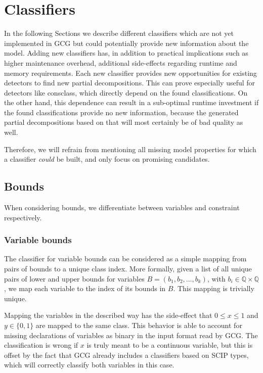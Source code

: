 	\section{Classifiers}
	
		In the following Sections we describe different classifiers which are not yet implemented in \ac{GCG} but could potentially provide new information about the model.
		Adding new classifiers has, in addition to practical implications such as higher maintenance overhead, additional side-effects regarding runtime and memory requirements.
		Each new classifier provides new opportunities for existing detectors to find new partial decompositions.
		This can prove especially useful for detectors like consclass, which directly depend on the found classifications.
		On the other hand, this dependence can result in a sub-optimal runtime investment if the found classifications provide no new information, because the generated partial decompositions based on that will most certainly be of bad quality as well. 
		
		Therefore, we will refrain from mentioning all missing model properties for which a classifier \textit{could} be built, and only focus on promising candidates.
		
		\clearpage
		
		\subsection{Bounds}
			
			When considering bounds, we differentiate between variables and constraint respectively.
			
			\subsubsection{Variable bounds}
			
				The classifier for variable bounds can be considered as a simple mapping from pairs of bounds to a unique class index.
				More formally, given a list of all unique pairs of lower and upper bounds for variables $B = (b_1, b_2, \ldots, b_k)$, with $b_i \in \mathbb{Q} \times \mathbb{Q}$, we map each variable to the index of its bounds in $B$.
				This mapping is trivially unique.
				
				Mapping the variables in the described way has the side-effect that $0 \leq x \leq 1$ and $y \in \{ 0, 1 \} $ are mapped to the same class.
				This behavior is able to account for missing declarations of variables as binary in the input format read by \ac{GCG}.
				The classification is wrong if $x$ is truly meant to be a continuous variable, but this is offset by the fact that \ac{GCG} already includes a classifiers based on \ac{SCIP} types, which will correctly classify both variables in this case.
				
